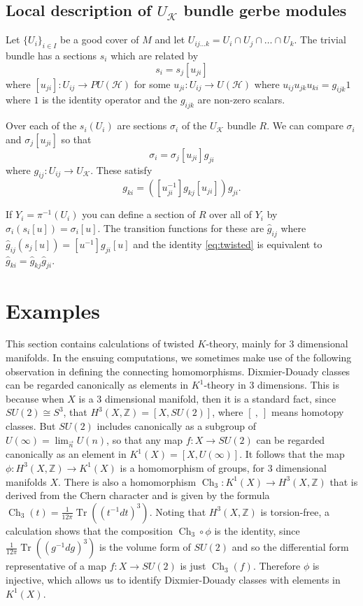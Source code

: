 \documentclass[a4paper,reqno]{amsart}
\DeclareMathOperator{\Ch}{Ch}
\DeclareMathOperator{\Tr}{Tr}
\theoremstyle{plain}
\theoremstyle{definition}
\theoremstyle{remark}
\numberwithin{equation}{section}
\numberwithin{figure}{section}
\newcommand{\cH}{{\mathcal H}}
\newcommand{\UK}{U{_\mathcal K}}
\newcommand{\<}{\langle}
\renewcommand{\>}{\rangle}
\begin{document}
\subsection{Local description of $\UK$ bundle gerbe modules}
Let $\{ U_i \}_{i\in I}$ be a good cover of $M$ and let $U_{ij\dots
k} = U_{i} \cap U_{j} \cap \dots \cap U_{k}$.
The trivial bundle has a sections $s_i$ which are related by
$$
s_i = s_j [u_{ji}]
$$
where $[u_{ji}] \colon U_{ij} \to PU(\cH)$ for some $u_{ji} \colon
U_{ij}\to U(\cH)$ where
$u_{ij}u_{jk}u_{ki} = g_{ijk}1$ where $1$ is the
identity operator and the $g_{ijk}$ are non-zero scalars.


Over each of the $s_i(U_i)$  are sections $\sigma_i $ of the $\UK$
bundle $R$. We can compare
$\sigma_i$ and $\sigma_j[u_{ji}]$ so that
$$
\sigma_i = \sigma_j [u_{ji}] g_{ji}
$$
where $g_{ij} \colon U_{ij} \to \UK$. These satisfy
\begin{equation}
\label{eq:twisted}
g_{ki} = ([u_{ji}^{-1}] g_{kj} [u_{ji}]) g_{ji}.
\end{equation}

If $Y_i = \pi^{-1}(U_i)$ you can define a section of $R$ over all of $Y_i$ by
$\hat\sigma_i ( s_i [u]) = \sigma_i[u]$.  The transition functions for these
are $\hat g_{ij}$ where $\hat g_{ij} (s_j[u]) = [u^{-1}] g_{ji} [u]$ and the
identity \eqref{eq:twisted}  is equivalent to $\hat g_{ki} = \hat
g_{kj} \hat g_{ji}$.



\section{Examples}
\label{sec:examples}

This section contains calculations of twisted $K$-theory, mainly for
3 dimensional manifolds. In the ensuing computations, we sometimes make
use of the  following observation in defining the connecting
homomorphisms. Dixmier-Douady classes can be regarded canonically as
elements in
$K^1$-theory in 3 dimensions. This is because when $X$ is a
3 dimensional manifold, then it is a standard fact, since $SU(2) \cong
S^3$, that
$ H^3(X, \mathbb Z) = [X, SU(2)]$, where
$[\ ,\ ]$ means homotopy classes.
But $SU(2)$ includes canonically as a subgroup of
$U(\infty) = \displaystyle\lim_{\stackrel{\to}{n}} U(n)$, so that any
map $f: X \to
SU(2)$ can be regarded canonically as an element in $K^1(X) = [X,
U(\infty)]$. It follows that the map
$\phi: H^3(X, \mathbb Z) \to K^1(X)$ is a homomorphism of groups, for
3 dimensional
manifolds $X$. There is also a homomorphism $\Ch_3: K^1(X)\to H^3( X,
\mathbb Z)$
that is derived from the Chern character and is given by the formula
$\Ch_3(t) = \frac{1}{12\pi}\Tr((t^{-1}dt)^3)$. Noting that
$H^3(X, \mathbb Z)$ is torsion-free, a calculation shows that
the composition $\Ch_3\circ \phi$ is the identity, since
$\frac{1}{12\pi}\Tr((g^{-1}dg)^3)$ is the volume form of $SU(2)$
and so the differential form representative of a map
$f: X \to SU(2)$ is just $\Ch_3(f)$.
Therefore $\phi$
is injective, which allows us to identify Dixmier-Douady classes
with elements in $K^1(X)$.
\end{document}
